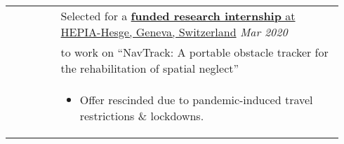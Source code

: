 \documentclass[letterpaper, 10pt, oneside]{article}
\begin{document}
\begin{longtable}{@{} p{0.14\linewidth} p{0.8\linewidth}}
                         & Selected for a \href{https://drive.google.com/file/d/1Rtlu6aHQKXntWhfEUcgB5tuNYMuvH04b}{\textbf{funded research internship} at HEPIA-Hesge, Geneva, Switzerland} \hfill \textsl{Mar 2020}                                \\
                         & to work on ``NavTrack: A portable obstacle tracker for the rehabilitation of spatial neglect''                                                                                                                           \\
                         & \parbox{0.8\textwidth}{                                                                                                                                                                                                  %
        \begin{itemize}[leftmargin=6ex, itemsep=-0.88ex, topsep=-0.88ex]
            \item Offer rescinded due to pandemic-induced travel restrictions \& lockdowns. \\
        \end{itemize}
    }
    \\
\end{longtable}
\end{document}
